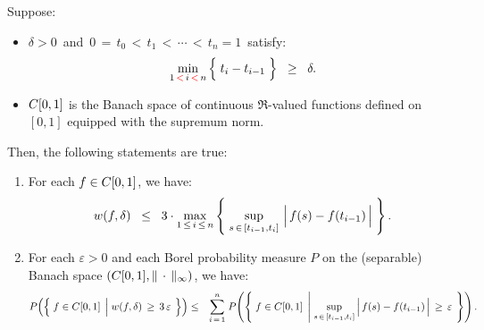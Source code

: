\begin{proposition}
\mbox{}\vskip 0.2cm
\noindent
Suppose:
\begin{itemize}
\item	$\delta > 0$\, and \,$0 \,=\, t_{0} \,<\, t_{1} \,<\, \cdots \,<\, t_{n} = 1$\, satisfy:
		\begin{equation*}
		\min_{1\,{\color{red}<}\,i\,{\color{red}<}\,n}\left\{\;\overset{{\color{white}.}}{t}_{i} - t_{i-1}\;\right\}
		\;\; \geq \;\; \delta.
		\end{equation*}
\item	$C[0,1]$ is the Banach space of continuous $\Re$-valued functions defined on $[0,1]$
		equipped with the supremum norm.
\end{itemize}
Then, the following statements are true:
\begin{enumerate}
\item	For each $f \in C[0,1]$, we have:
		\begin{equation*}
		w(f,\delta) \;\; \leq \;\; 3 \cdot
			\max_{1\,\leq\,i\,\leq\,n}\left\{\;
				\sup_{s\,\in\,[t_{i-1},t_{i}]}\,\left\vert\,\overset{{\color{white}.}}{f}(s) - f(t_{i-1})\,\right\vert
			\;\right\}.
		\end{equation*}
\item	For each $\varepsilon > 0$ and each Borel probability measure $P$ on
		the (separable) Banach space $\left(C[0,1],\Vert\,\cdot\,\Vert_{\infty}\right)$,
		we have:
		\begin{eqnarray*}
		P\!\left(\left\{\;f\in\Czo\;\left\vert\;\overset{{\color{white}1}}{w}(f,\delta)\,\geq\,3\,\varepsilon\right.\;\right\}\right)
		&\leq& \overset{n}{\underset{i\,=\,1}{\sum}}\;
			P\!\left(\left\{\; f\in\Czo \;\left\vert\;
				\underset{s\,\in\,[t_{i-1},t_{i}]}{\sup}
				\left\vert\,f(s) \overset{{\color{white}.}}{-} f(t_{i-1})\,\right\vert\,\geq\,\varepsilon
				\right.\;\right\}\right).
		\end{eqnarray*}
\end{enumerate}
\end{proposition}
\proof
